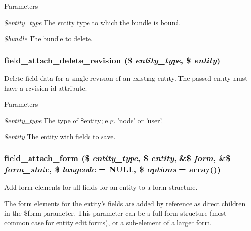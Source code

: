 \begin{DoxyParams}{Parameters}
\item[{\em \$entity\_\-type}]The entity type to which the bundle is bound. \item[{\em \$bundle}]The bundle to delete. \end{DoxyParams}
\hypertarget{group__field__attach_gaa9eae65e6d9f1996cb27a55ba25b56e9}{
\subsubsection[{field\_\-attach\_\-delete\_\-revision}]{\setlength{\rightskip}{0pt plus 5cm}field\_\-attach\_\-delete\_\-revision (\$ {\em entity\_\-type}, \/  \$ {\em entity})}}
\label{group__field__attach_gaa9eae65e6d9f1996cb27a55ba25b56e9}
Delete field data for a single revision of an existing entity. The passed entity must have a revision id attribute.


\begin{DoxyParams}{Parameters}
\item[{\em \$entity\_\-type}]The type of \$entity; e.g. 'node' or 'user'. \item[{\em \$entity}]The entity with fields to save. \end{DoxyParams}
\hypertarget{group__field__attach_gac5bd0213dae78f7c1b3235f3acdde2c6}{
\subsubsection[{field\_\-attach\_\-form}]{\setlength{\rightskip}{0pt plus 5cm}field\_\-attach\_\-form (\$ {\em entity\_\-type}, \/  \$ {\em entity}, \/  \&\$ {\em form}, \/  \&\$ {\em form\_\-state}, \/  \$ {\em langcode} = {\ttfamily NULL}, \/  \$ {\em options} = {\ttfamily array()})}}
\label{group__field__attach_gac5bd0213dae78f7c1b3235f3acdde2c6}
Add form elements for all fields for an entity to a form structure.

The form elements for the entity's fields are added by reference as direct children in the \$form parameter. This parameter can be a full form structure (most common case for entity edit forms), or a sub-\/element of a larger form.

